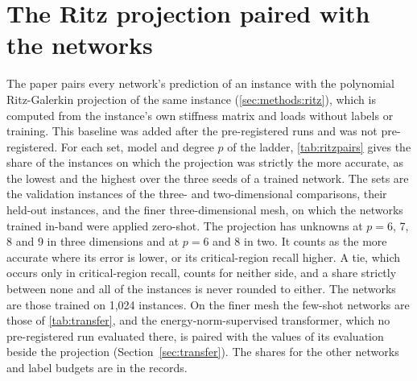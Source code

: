 \section{The Ritz projection paired with the networks}\label{supp:ritz}

The paper pairs every network's prediction of an instance with the polynomial Ritz-Galerkin
projection of the same instance (\cref{sec:methods:ritz}), which is computed from the
instance's own stiffness matrix and loads without labels or training. This baseline was added after the pre-registered runs and was not pre-registered.
For each set, model and degree $p$ of the ladder, \cref{tab:ritzpairs} gives the share of
the instances on which the projection was strictly the more accurate, as the lowest and the
highest over the three seeds of a trained network. The sets are the validation instances of
the three- and two-dimensional comparisons, their held-out instances, and the finer
three-dimensional mesh, on which the networks trained in-band were applied zero-shot. The
projection has \numRitzThreeK{} unknowns at $p=6$, 7, 8 and 9 in three dimensions and
\numRitzTwoK{} at $p=6$ and 8 in two. It counts as the more accurate where its error is
lower, or its critical-region recall higher. A tie, which occurs only in critical-region
recall, counts for neither side, and a share strictly between none and all of the instances
is never rounded to either. The networks are those trained on 1,024 instances. On the finer mesh the few-shot networks are those of \cref{tab:transfer}, and the
energy-norm-supervised transformer, which no pre-registered run evaluated there, is paired
with the values of its evaluation beside the projection (Section~\ref{sec:transfer}). The
shares for the other networks and label budgets are in the records.

\begin{landscape}

\end{landscape}
